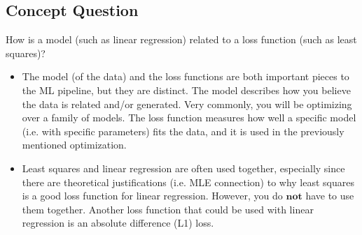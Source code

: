 \documentclass[11pt,letterpaper]{article}
\begin{document}
\subsection{Concept Question}
How is a model (such as linear regression) related to a loss function (such as least squares)?

\begin{itemize}
    \item The model (of the data) and the loss functions are both important pieces to the ML pipeline, but they are distinct. The model describes how you believe the data is related and/or generated. Very commonly, you will be optimizing over a family of models. The loss function measures how well a specific model (i.e. with specific parameters) fits the data, and it is used in the previously mentioned optimization. 
    \item Least squares and linear regression are often used together, especially since there are theoretical justifications (i.e. MLE connection) to why least squares is a good loss function for linear regression. However, you do $\mathbf{not}$ have to use them together. Another loss function that could be used with linear regression is an absolute difference (L1) loss.
\end{itemize}
\vspace{25mm}
\end{document}
